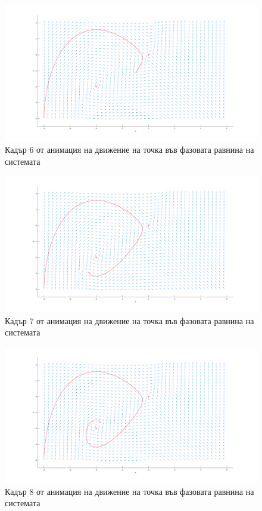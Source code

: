 \documentclass[a4paper, 12pt]{article}
\begin{document}
\begin{figure}[ht]
    \centering
    \includegraphics[width=\textwidth]{move6.png}
    \caption{Кадър 6 от анимация на движение на точка във фазовата равнина на системата}
\end{figure}

\begin{figure}[ht]
    \centering
    \includegraphics[width=\textwidth]{move7.png}
    \caption{Кадър 7 от анимация на движение на точка във фазовата равнина на системата}
\end{figure}

\begin{figure}[ht]
    \centering
    \includegraphics[width=\textwidth]{move8.png}
    \caption{Кадър 8 от анимация на движение на точка във фазовата равнина на системата}
\end{figure}
\end{document}

